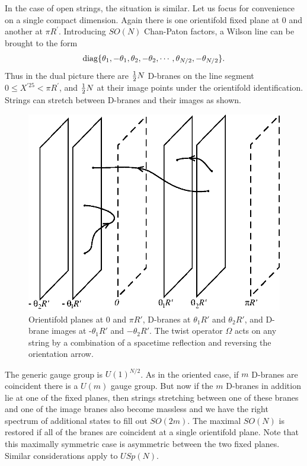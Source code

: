 \documentclass[12pt]{article}
\def\be{\begin{equation}}
\def\ee{\end{equation}}
\begin{document}
In the case of open strings, the situation is similar.
Let us focus for convenience on a single compact dimension.  Again
there is one orientifold fixed plane at $0$ and another at $\pi R^\prime$.  
Introducing $SO(N)$ Chan-Paton factors, a Wilson line can be brought to
the form 
\be
{\rm diag}
\{\theta_1,-\theta_1,\theta_2,-\theta_2,\cdots,
\theta_{N/2},-\theta_{N/2}\}.
\ee
Thus in the dual picture there are 
${1\over 2}N$ D-branes on the line segment $0\leq X^{\prime25}<\pi
R^\prime$, and ${1\over 2}N$ at their image points under the orientifold
identification. %
Strings can stretch between D-branes and their images as shown.
\begin{figure}
\begin{center}
\leavevmode
\includegraphics{orientibrane.eps}
\end{center}
\caption[]{Orientifold planes at $0$ and $\pi R'$, D-branes at
$\theta_1 R'$ and $\theta_2 R'$, and D-brane images at -$\theta_1 R'$ and
$-\theta_2 R'$.  The twist operator $\Omega$ acts on any string by a
combination of a spacetime reflection and reversing the orientation
arrow.}
\end{figure}
The generic gauge group is $U(1)^{N/2}$.  As in the oriented case,
if $m$ D-branes are coincident there is a $U(m)$ gauge group.
But now if the $m$ D-branes in addition lie at one of the fixed planes,
then strings stretching between one of these branes and one of the image
branes also become massless and we have the right spectrum of additional
states to fill out $SO(2m)$. The maximal $SO(N)$ is restored if all of
the branes are coincident at a
single orientifold plane.  Note that this maximally symmetric case is
asymmetric between the two fixed planes.
Similar considerations apply
to $USp(N)$.  
\end{document}

